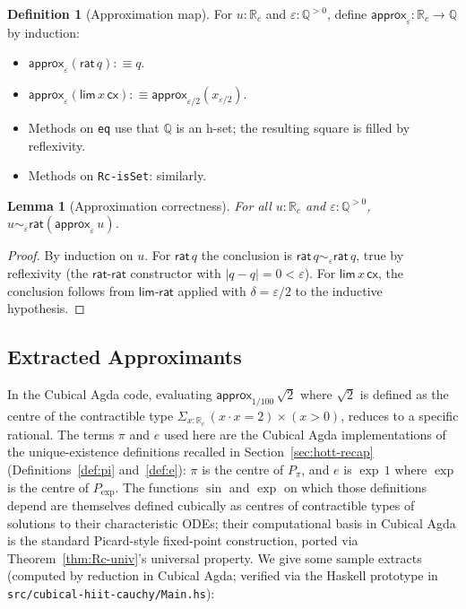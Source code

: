 \documentclass[12pt]{article}
\newtheorem{lemma}[theorem]{Lemma}
\theoremstyle{definition}
\newtheorem{definition}[theorem]{Definition}
\theoremstyle{remark}
\newcommand{\Q}{\mathbb{Q}}
\newcommand{\Rc}{\mathbb{R}_{c}}
\newcommand{\rat}{\mathsf{rat}}
\newcommand{\hlim}{\mathsf{lim}}
\newcommand{\close}{\mathrel{\sim}}
\begin{document}
\begin{definition}[Approximation map]
\label{def:approx}
For $u : \Rc$ and $\varepsilon : \Q^{>0}$, define
$\mathsf{approx}_\varepsilon : \Rc \to \Q$ by induction:
\begin{itemize}
\item $\mathsf{approx}_\varepsilon(\rat\,q) :\equiv q$.
\item $\mathsf{approx}_\varepsilon(\hlim\,x\,\mathsf{cx}) :\equiv
\mathsf{approx}_{\varepsilon/2}(x_{\varepsilon/2})$.
\item Methods on \texttt{eq} use that $\Q$ is an h-set; the resulting
square is filled by reflexivity.
\item Methods on \texttt{Rc-isSet}: similarly.
\end{itemize}
\end{definition}

\begin{lemma}[Approximation correctness]
\label{lem:approx-correct}
For all $u : \Rc$ and $\varepsilon : \Q^{>0}$,
$u \close_\varepsilon \rat(\mathsf{approx}_\varepsilon\,u)$.
\end{lemma}
\begin{proof}
By induction on $u$. For $\rat\,q$ the conclusion is
$\rat\,q \close_\varepsilon \rat\,q$, true by reflexivity (the
$\mathsf{rat\text{-}rat}$ constructor with $|q - q| = 0 < \varepsilon$).
For $\hlim\,x\,\mathsf{cx}$, the conclusion follows from
$\mathsf{lim\text{-}rat}$ applied with $\delta = \varepsilon/2$ to the
inductive hypothesis.
\end{proof}

\subsection{Extracted Approximants}

In the Cubical Agda code, evaluating
$\mathsf{approx}_{1/100}\,\sqrt{2}$
where $\sqrt{2}$ is defined as the centre of the contractible type
$\Sigma_{x : \Rc}\,(x \cdot x = 2) \times (x > 0)$, reduces to a
specific rational. The terms $\pi$ and $e$ used here are the Cubical
Agda implementations of the unique-existence definitions recalled in
Section~\ref{sec:hott-recap} (Definitions~\ref{def:pi} and~\ref{def:e}):
$\pi$ is the centre of $P_{\pi}$, and $e$ is $\exp\,1$ where $\exp$ is
the centre of $P_{\exp}$. The functions $\sin$ and $\exp$ on which
those definitions depend are themselves defined cubically as centres of
contractible types of solutions to their characteristic ODEs; their
computational basis in Cubical Agda is the standard Picard-style
fixed-point construction, ported via Theorem~\ref{thm:Rc-univ}'s
universal property. We give some sample extracts (computed by
reduction in Cubical Agda; verified via the Haskell prototype in
\verb|src/cubical-hiit-cauchy/Main.hs|):
\end{document}
